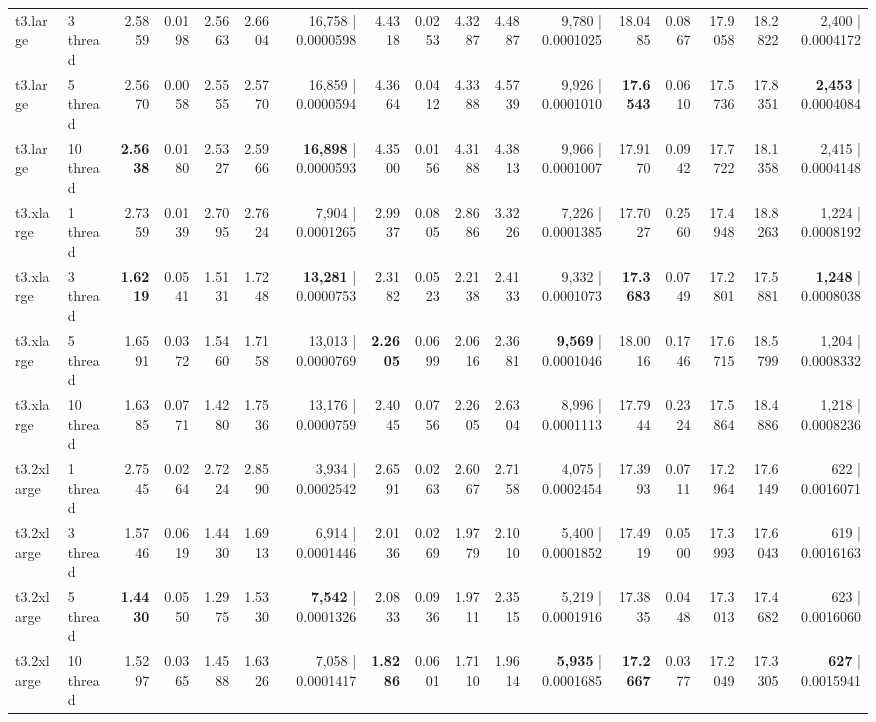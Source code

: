 \documentclass[conference]{IEEEtran}
\begin{document}
\begin{table}[h]
{\begin{tabular}{ll|rrrrr|rrrrr|rrrrr}
				t3.large & 3 thread & 2.5859 & 0.0198 & 2.5663 & 2.6604 & 16,758 | 0.0000598 & 4.4318 & 0.0253 & 4.3287 & 4.4887 & 9,780 | 0.0001025 & 18.0485 & 0.0867 & 17.9058 & 18.2822 & 2,400 | 0.0004172 \\
				t3.large & 5 thread & 2.5670 & 0.0058 & 2.5555 & 2.5770 & 16,859 | 0.0000594 & 4.3664 & 0.0412 & 4.3388 & 4.5739 & 9,926 | 0.0001010 & \textbf{17.6543} & 0.0610 & 17.5736 & 17.8351 & \textbf{2,453} | 0.0004084 \\
				t3.large & 10 thread & \textbf{2.5638} & 0.0180 & 2.5327 & 2.5966 & \textbf{16,898} | 0.0000593 & 4.3500 & 0.0156 & 4.3188 & 4.3813 & 9,966 | 0.0001007 & 17.9170 & 0.0942 & 17.7722 & 18.1358 & 2,415 | 0.0004148 \\
				\midrule
				t3.xlarge & 1 thread & 2.7359 & 0.0139 & 2.7095 & 2.7624 & 7,904 | 0.0001265 & 2.9937 & 0.0805 & 2.8686 & 3.3226 & 7,226 | 0.0001385 & 17.7027 & 0.2560 & 17.4948 & 18.8263 & 1,224 | 0.0008192 \\
				t3.xlarge & 3 thread & \textbf{1.6219} & 0.0541 & 1.5131 & 1.7248 & \textbf{13,281} | 0.0000753 & 2.3182 & 0.0523 & 2.2138 & 2.4133 & 9,332 | 0.0001073 & \textbf{17.3683} & 0.0749 & 17.2801 & 17.5881 & \textbf{1,248} | 0.0008038 \\
				t3.xlarge & 5 thread & 1.6591 & 0.0372 & 1.5460 & 1.7158 & 13,013 | 0.0000769 & \textbf{2.2605} & 0.0699 & 2.0616 & 2.3681 & \textbf{9,569} | 0.0001046 & 18.0016 & 0.1746 & 17.6715 & 18.5799 & 1,204 | 0.0008332 \\
				t3.xlarge & 10 thread & 1.6385 & 0.0771 & 1.4280 & 1.7536 & 13,176 | 0.0000759 & 2.4045 & 0.0756 & 2.2605 & 2.6304 & 8,996 | 0.0001113 & 17.7944 & 0.2324 & 17.5864 & 18.4886 & 1,218 | 0.0008236 \\
				\midrule
				t3.2xlarge & 1 thread & 2.7545 & 0.0264 & 2.7224 & 2.8590 & 3,934 | 0.0002542 & 2.6591 & 0.0263 & 2.6067 & 2.7158 & 4,075 | 0.0002454 & 17.3993 & 0.0711 & 17.2964 & 17.6149 & 622 | 0.0016071 \\
				t3.2xlarge & 3 thread & 1.5746 & 0.0619 & 1.4430 & 1.6913 & 6,914 | 0.0001446 & 2.0136 & 0.0269 & 1.9779 & 2.1010 & 5,400 | 0.0001852 & 17.4919 & 0.0500 & 17.3993 & 17.6043 & 619 | 0.0016163 \\
				t3.2xlarge & 5 thread & \textbf{1.4430} & 0.0550 & 1.2975 & 1.5330 & \textbf{7,542} | 0.0001326 & 2.0833 & 0.0936 & 1.9711 & 2.3515 & 5,219 | 0.0001916 & 17.3835 & 0.0448 & 17.3013 & 17.4682 & 623 | 0.0016060 \\
				t3.2xlarge & 10 thread & 1.5297 & 0.0365 & 1.4588 & 1.6326 & 7,058 | 0.0001417 & \textbf{1.8286} & 0.0601 & 1.7110 & 1.9614 & \textbf{5,935} | 0.0001685 & \textbf{17.2667} & 0.0377 & 17.2049 & 17.3305 & \textbf{627} | 0.0015941 \\

\end{tabular}}
\end{table}
\end{document}
